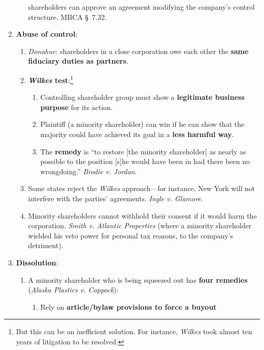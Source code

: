 \begin{enumerate}
\begin{enumerate}
        shareholders can approve an agreement modifying the company's control 
        structure. MBCA \S\ 7.32.
    \end{enumerate}
    \item \textbf{Abuse of control}:
    \begin{enumerate}
        \item \emph{Donahue}: shareholders in a close corporation owe each 
        other the \textbf{same fiduciary duties as partners}.
        \item \textbf{\emph{Wilkes} test}:\footnote{But this can be an 
        inefficient solution. For instance, \emph{Wilkes} took almost ten 
        years of litigation to be resolved.}
        \begin{enumerate}
            \item Controlling shareholder group must show a \textbf{legitimate 
            business purpose} for its action.
            \item Plaintiff (a minority shareholder) can win if he can show 
            that the majority could have achieved its goal in a \textbf{less 
            harmful way}.
            \item The \textbf{remedy} is ``to restore [the minority 
            shareholder] as nearly as possible to the position [s]he would 
            have been in had there been no wrongdoing.'' \emph{Brodie v. 
            Jordan}.
        \end{enumerate}
        \item Some states reject the \emph{Wilkes} approach---for instance, 
        New York will not interfere with the parties' agreements. \emph{Ingle 
        v. Glamore}.
        \item Minority shareholders cannot withhold their consent if it would 
        harm the corporation. \emph{Smith v. Atlantic Properties} (where a 
        minority shareholder wielded his veto power for personal tax reasons, 
        to the company's detriment).
    \end{enumerate}
    \item \textbf{Dissolution}:
    \begin{enumerate}
        \item A minority shareholder who is being squeezed out has 
        \textbf{four remedies} (\emph{Alaska Plastics v. Coppock}):
        \begin{enumerate}
            \item Rely on \textbf{article/bylaw provisions to force a buyout} 

\end{enumerate}
\end{enumerate}
\end{enumerate}
